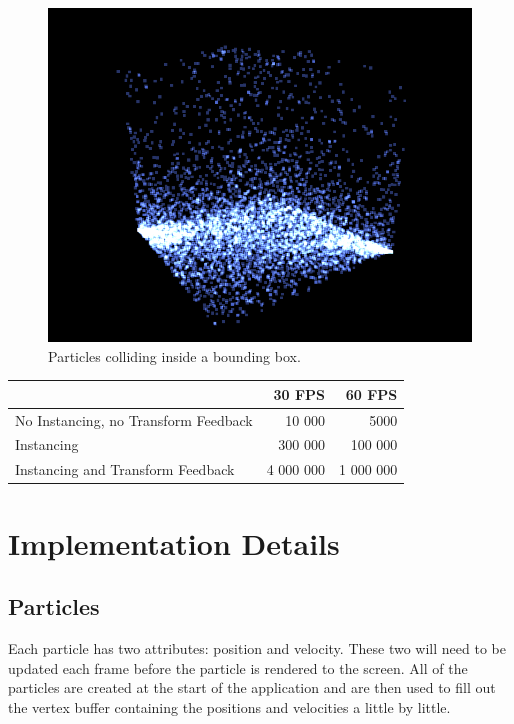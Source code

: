 \documentclass[report]{vgtc}
\begin{document}
\begin{figure}[H]
\includegraphics[scale=0.57]{img/cube.png}
\caption{Particles colliding inside a bounding box.}
\end{figure}

\begin{table}[H]
	\begin{tabular}{l | r | r}
		  & 30 FPS & 60 FPS   \\[0.75ex] \hline
  		No Instancing, no Transform Feedback & 10 000 & 5000  \\[0.75ex]
  		Instancing & 300 000 & 100 000  \\[0.75ex]
		Instancing and Transform Feedback & 4 000 000 & 1 000 000 \\[0.75ex]
	\end{tabular}
\end{table}	


	\section{Implementation Details}	
	
	\subsection{Particles}

Each particle has two attributes: position and velocity. These two will need to be updated each frame before the particle is rendered to the screen. All of the particles are created at the start of the application and are then used to fill out the vertex buffer containing the positions and velocities a little by little.
\end{document}
